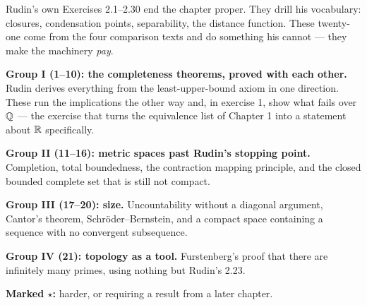
\begin{roadmap}
Rudin's own Exercises 2.1--2.30 end the chapter proper. They drill his
vocabulary: closures, condensation points, separability, the distance
function. These twenty-one come from the four comparison texts and do
something his cannot --- they make the machinery \emph{pay}.

\medskip
\raggedright
\textbf{Group I (1--10): the completeness theorems, proved with each other.}
Rudin derives everything from the least-upper-bound axiom in one direction.
These run the implications the other way and, in exercise 1, show what fails
over $\mathbb{Q}$ --- the exercise that turns the equivalence list of Chapter 1 into
a statement about $\mathbb{R}$ specifically.

\medskip
\textbf{Group II (11--16): metric spaces past Rudin's stopping point.}
Completion, total boundedness, the contraction mapping principle, and the
closed bounded complete set that is still not compact.

\medskip
\textbf{Group III (17--20): size.} Uncountability without a diagonal
argument, Cantor's theorem, Schr\"oder--Bernstein, and a compact space
containing a sequence with no convergent subsequence.

\medskip
\textbf{Group IV (21): topology as a tool.} Furstenberg's proof that there
are infinitely many primes, using nothing but Rudin's 2.23.

\medskip
\textbf{Marked $\star$:} harder, or requiring a result from a later chapter.
\end{roadmap}

